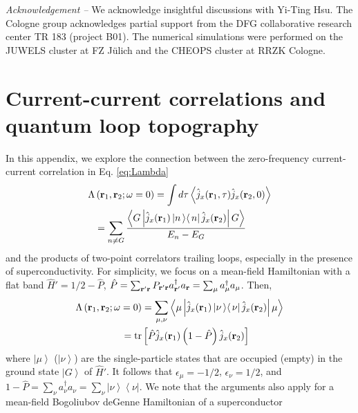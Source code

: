 \documentclass[amsmath,amssymb, aps, prl, twocolumn]{revtex4-1}
\begin{document}
{\it Acknowledgement --} We acknowledge insightful discussions with Yi-Ting Hsu. The Cologne group acknowledges partial support
from the DFG collaborative research center TR 183 (project B01). The numerical simulations were performed on the JUWELS cluster 
at FZ J\"ulich and the CHEOPS cluster at RRZK Cologne.




\newpage
\appendix

\section{Current-current correlations and quantum loop topography}

In this appendix, we explore the connection between the zero-frequency current-current correlation in Eq. \ref{eq:Lambda}
\begin{equation}
\left. \begin{aligned}
\Lambda&\left({\bf r}_1, {\bf r}_2;\omega=0\right) = \int d\tau \left\langle \hat{j}_x({\bf r}_1,\tau)\hat{j}_x({\bf r}_2,0) \right\rangle  \\
&=\sum_{n\ne G} \frac{\left\langle G \left| \hat{j}_x({\bf r}_1)  \left|n\left\rangle  \right\langle n\right| \hat{j}_x({\bf r}_2)\right| G\right\rangle}{E_n-E_G} 
\end{aligned}
\right.
\end{equation}
and the products of two-point correlators trailing loops, especially in the presence of superconductivity. For simplicity, we focus on a mean-field Hamiltonian with a flat band $\hat{H}'=1/2-\hat P$, $\hat P=\sum_{{\bf r}'{\bf r}}P_{{\bf r}'{\bf r}}a^\dagger_{{\bf r}'} a_{\bf r}=\sum_{\mu}a^\dagger_\mu a_\mu$. Then, 
\begin{equation}
\left. \begin{aligned}
\Lambda\left({\bf r}_1, {\bf r}_2;\omega=0\right)&
=\sum_{\mu, \nu}\left\langle \mu \left| \hat{j}_x({\bf r}_1)  \left|\nu\left\rangle  \right\langle \nu\right|\hat{j}_x({\bf r}_2)\right| \mu\right\rangle \\
= \mbox{tr}&\left[\hat{P} \hat{j}_x({\bf r}_1) \left(1-\hat{P}\right) \hat{j}_x({\bf r}_2)\right]
\end{aligned}
\right.
\label{eq:app1}
\end{equation}
where $\left|\mu\right\rangle$ ($\left|\nu\right\rangle$) are the single-particle states that are occupied (empty) in the ground state $\left|G\right\rangle$ of $\hat{H}'$. It follows that $\epsilon_\mu=-1/2$, $\epsilon_\nu=1/2$, and $1-\hat P=\sum_{\nu}a^\dagger_\nu a_\nu=\sum_{\nu}\left|\nu\right\rangle\left\langle\nu\right|$. We note that the arguments also apply for a mean-field Bogoliubov deGenne Hamiltonian of a superconductor
\end{document}
